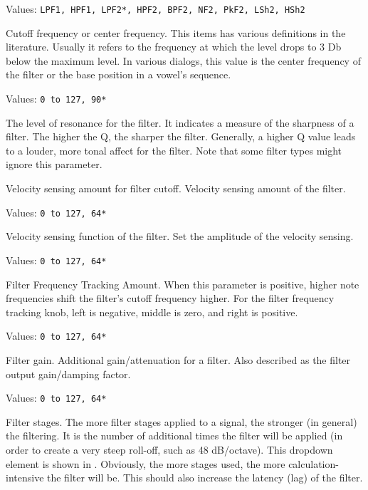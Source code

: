    Values: \texttt{LPF1, HPF1, LPF2*, HPF2, BPF2, NF2, PkF2, LSh2, HSh2}

   Cutoff frequency or center frequency.
   This items has various definitions in the literature. 
   Usually it refers to the frequency at which the level
   drops to 3 Db below the maximum level.
   In various dialogs, this value is the
   center frequency of the filter or the base position in
   a vowel's sequence.

   Values: \texttt{0 to 127, 90*}

   The level of resonance for the filter. 
   It indicates a measure of the sharpness of a filter.
   The higher the Q, the sharper the filter.
   Generally, a higher Q value leads to a louder, more tonal
   affect for the filter.
   Note that some filter types might ignore this parameter.

   Velocity sensing amount for filter cutoff.
   Velocity sensing amount of the filter.

   Values: \texttt{0 to 127, 64*}

   Velocity sensing function of the filter.
   Set the amplitude of the velocity sensing.

   Values: \texttt{0 to 127, 64*}

   Filter Frequency Tracking Amount.
   When this parameter is positive, higher note
   frequencies shift the filter’s cutoff frequency higher.
   For the filter frequency tracking knob, left is negative, middle is
   zero, and right is positive.

   Values: \texttt{0 to 127, 64*}

   Filter gain.
   Additional gain/attenuation for a filter.
   Also described as the filter output gain/damping factor.

   Values: \texttt{0 to 127, 64*}

   Filter stages.
   The more filter stages applied to a signal, the stronger (in general) the
   filtering.
   It is the number of additional times the filter will be applied (in
   order to create a very steep roll-off, such as 48 dB/octave).
   This dropdown
   element is shown in
   .
   Obviously, the more stages used, the more calculation-intensive the
   filter will be.  This should also increase the latency (lag) of the
   filter.

